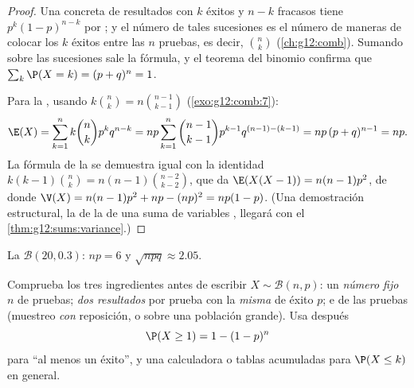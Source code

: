 \begin{proof}
Una  concreta de resultados con $k$ éxitos y $n-k$ fracasos tiene
 $p^k(1-p)^{n-k}$ por ; y el número de tales
sucesiones es el número de maneras de colocar los $k$ éxitos entre las $n$
pruebas, es decir, $\binom nk$ (\cref{ch:g12:comb}). Sumando sobre las
sucesiones sale la fórmula, y el teorema del binomio confirma que
$\sum_k \P(X = k) = (p + q)^n = 1$.

Para la , usando $k\binom nk = n\binom{n-1}{k-1}$
(\cref{exo:g12:comb:7}):
\[
\E(X) = \sum_{k=1}^{n} k\binom nk p^k q^{n-k}
= np\sum_{k=1}^{n} \binom{n-1}{k-1} p^{k-1} q^{(n-1)-(k-1)}
= np\,(p + q)^{n-1} = np .
\]
La fórmula de la  se demuestra igual con la identidad
$k(k-1)\binom nk = n(n-1)\binom{n-2}{k-2}$, que da
$\E(X(X-1)) = n(n-1)p^2$, de donde
$\V(X) = n(n-1)p^2 + np - (np)^2 = np(1-p)$. (Una demostración
estructural, la de la  de una suma de variables ,
llegará con el \cref{thm:g12:sums:variance}.)
\end{proof}

\begin{omfigure}

{\small La  $\mathcal B(20, 0.3)$:  $np = 6$ y  $\sqrt{npq} \approx 2.05$.}
\end{omfigure}

\begin{method}\label{met:g12:randvar:recognize}
Comprueba los tres ingredientes antes de escribir
$X \sim \mathcal B(n,p)$: un \emph{número fijo} $n$ de pruebas; \emph{dos
resultados} por prueba con la \emph{misma}  de éxito $p$; e
\emph{} de las pruebas (muestreo \emph{con} reposición, o
sobre una población grande). Usa después
\[
\P(X \geq 1) = 1 - (1-p)^n
\]
para ``al menos un éxito'', y una calculadora o tablas acumuladas para
$\P(X \leq k)$ en general.
\end{method}

